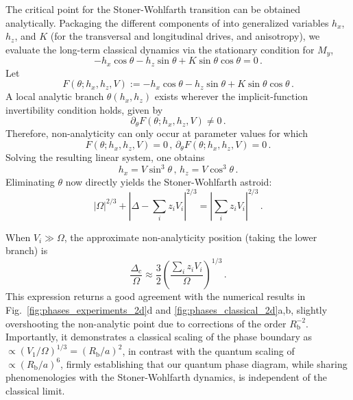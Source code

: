 \documentclass[english,floatfix,twocolumn,showpacs, aps, prx, reprint, superscriptaddress, longbibliography]{revtex4-2}
\begin{document}
The critical point for the Stoner-Wohlfarth transition can be obtained analytically. Packaging the different components of  into generalized variables $h_x$, $h_z$, and $K$ (for the transversal and longitudinal drives, and anisotropy), we evaluate the long-term classical dynamics via the stationary condition for $M_y$,
\begin{equation}
-h_x \cos\theta - h_z \sin\theta + K \sin\theta \cos\theta = 0 \, .
\end{equation}
Let
\begin{equation}
F(\theta; h_x, h_z, V ) := -h_x \cos\theta - h_z \sin\theta + K \sin\theta \cos\theta \, .
\end{equation}
A local analytic branch $\theta (h_x, h_z)$ exists wherever the implicit-function invertibility condition holds, given by
\begin{equation}
\partial_\theta F(\theta; h_x,h_z,V ) \neq 0 \, .
\end{equation}
Therefore, non-analyticity can only occur at parameter values for which
\begin{equation}
F(\theta; h_x, h_z, V ) = 0 \, , \, \partial_\theta F(\theta; h_x, h_z, V ) = 0 \, .
\label{eq:nonanalyticity_conditions}
\end{equation}
Solving the resulting linear system, one obtains
\begin{equation}
h_x = V \sin^3 \theta \, , \, h_z = V \cos^3 \theta \, .
\end{equation}
Eliminating $\theta$ now directly yields the Stoner-Wohlfarth astroid:
\begin{equation}
|\Omega|^{2/3} + \left| \Delta - \sum_i z_i V_i \right|^{2/3} = \left|\sum_i z_i V_i \right|^{2/3} \, .
\label{eq:SW_astroid}
\end{equation}

When $V_i \gg \Omega$, the approximate non-analyticity position (taking the lower branch) is
\begin{equation}
\frac{\Delta_c}{\Omega} \approx \frac{3}{2} \left( \frac{\sum_i z_i V_i}{\Omega} \right)^{1/3} \, .
\label{eq:SW_approximate_solution}
\end{equation}
This expression returns a good agreement with the numerical results in Fig.~\ref{fig:phases_experiments_2d}d and \ref{fig:phases_classical_2d}a,b, slightly overshooting the non-analytic point due to corrections of the order $R_\mathrm{b}^{-2}$. Importantly, it demonstrates a classical scaling of the phase boundary as $\propto (V_1/\Omega)^{1/3} = (R_\mathrm{b}/a)^2$, in contrast with the quantum scaling of $\propto (R_\mathrm{b}/a)^6$, firmly establishing that our quantum phase diagram, while sharing phenomenologies with the Stoner-Wohlfarth dynamics, is independent of the classical limit. 
\end{document}
